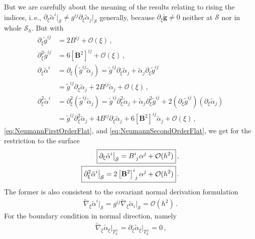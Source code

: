 \documentclass[a4paper,11pt]{scrartcl}
\newcommand{\surf}{\mathcal{S}}
\newcommand{\surfh}{\surf_{h}}
\newcommand{\landau}{\mathcal{O}}
\newcommand{\gb}{\mathbf{g}}
\newcommand{\tgb}{\tilde{\gb}}
\newcommand{\tg}{\tilde{g}}
\newcommand{\Bb}{\mathbf{B}}
\newcommand{\talpha}{\tilde{\alpha}}
\newcommand{\tnabla}{\tilde{\nabla}}
\newcommand{\boundary}[1]{\Upsilon_{h}^{#1}}
\newcommand{\AtBoundary}[1]{\big|_{\boundary{#1}}}
\newcommand{\AtSurface}{\big|_{\surf}}
\newcommand{\formComma}{\,\text{,}}
\newcommand{\formPeriod}{\,\text{.}}
\newcommand{\ie}{i.\,e.}%
\begin{document}
    But we are carefully about the meaning of the results relating to rising the indices,
    \ie, \( \partial_{\xi}\talpha^{i}\AtSurface \neq g^{ij}\partial_{\xi}\talpha_{j}\AtSurface  \) generally,
    because \(\partial_{\xi}\tgb \neq 0  \) neither at \( \surf \) nor in whole \( \surfh \).
    But with
    \begin{align}
      \partial_{\xi}\tg^{ij} &= 2B^{ij} + \landau(\xi) \formComma\\
      \partial_{\xi}^{2}\tg^{ij} &= 6\left[ \Bb^{2} \right]^{ij} + \landau(\xi) \formComma\\
      \partial_{\xi}\talpha^{i} &= \partial_{\xi}\left(\tg^{ij}\talpha_{j}\right) 
                                = \tg^{ij}\partial_{\xi}\talpha_{j} + \talpha_{j}\partial_{\xi}\tg^{ij} \\
                                &= \tg^{ij}\partial_{\xi}\talpha_{j} + 2B^{ij}\talpha_{j} + \landau(\xi) \formComma  \\
      \partial_{\xi}^{2}\talpha^{i} &= \partial_{\xi}^{2}\left(\tg^{ij}\talpha_{j}\right)
                                = \tg^{ij}\partial_{\xi}^{2}\talpha_{j} + \talpha_{j}\partial_{\xi}^{2}\tg^{ij} 
                                      + 2\left( \partial_{\xi}\tg^{ij} \right)\left( \partial_{\xi}\talpha_{j}\right)\\
                               &= \tg^{ij}\partial_{\xi}^{2}\talpha_{j} + 4B^{ij}\partial_{\xi}\talpha_{j} + 6\left[ \Bb^{2} \right]^{ij}\talpha_{j}  + \landau(\xi) \formComma
    \end{align}
    \eqref{eq:NeumannFirstOrderFlat}, and \eqref{eq:NeumannSecondOrderFlat}, we get for the restriction to the surface
    \begin{align}
      \boxed{\partial_{\xi}\talpha^{i}\AtSurface = \tensor{B}{^{i}_{j}}\alpha^{j} + \landau(h^{2})} \formComma\\
      \boxed{\partial_{\xi}^{2}\talpha^{i}\AtSurface = 2 \tensor{\left[ \Bb^{2} \right]}{^{i}_{j}}\alpha^{j} + \landau(h^{2})} \formPeriod
    \end{align}
    The former is also consistent to the covariant normal derivation formulation
    \begin{align}
      \boxed{\tnabla_{\xi}\talpha^{i}\AtSurface = g^{ij}\tnabla_{\xi}\talpha_{i}\AtSurface = \landau(h^{2})} \formPeriod
    \end{align}
    For the boundary condition in normal direction, namely
    \begin{align}
      \tnabla_{\xi}\talpha_{\xi}\AtBoundary{\pm} =  \partial_{\xi} \talpha_{\xi}\AtBoundary{\pm} = 0 \formComma
    \end{align}
\end{document}
